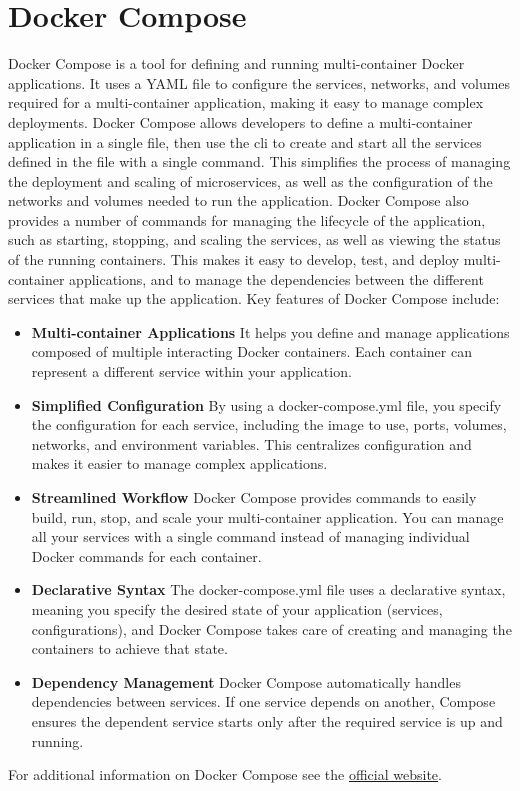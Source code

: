 \section {Docker Compose}
Docker Compose is a tool for defining and running multi-container Docker applications. It uses a YAML file to configure the services, networks, and volumes required for a multi-container application, making it easy to manage complex deployments. Docker Compose allows developers to define a multi-container application in a single file, then use the \gls{cli} to create and start all the services defined in the file with a single command. This simplifies the process of managing the deployment and scaling of microservices, as well as the configuration of the networks and volumes needed to run the application. Docker Compose also provides a number of commands for managing the lifecycle of the application, such as starting, stopping, and scaling the services, as well as viewing the status of the running containers. This makes it easy to develop, test, and deploy multi-container applications, and to manage the dependencies between the different services that make up the application.
Key features of Docker Compose include:
\begin{itemize}
    \item \textbf{Multi-container Applications} It helps you define and manage applications composed of multiple interacting Docker containers. Each container can represent a different service within your application. 
    \item \textbf{Simplified Configuration} By using a docker-compose.yml file, you specify the configuration for each service, including the image to use, ports, volumes, networks, and environment variables. This centralizes configuration and makes it easier to manage complex applications. 
    \item \textbf{Streamlined Workflow} Docker Compose provides commands to easily build, run, stop, and scale your multi-container application. You can manage all your services with a single command instead of managing individual Docker commands for each container. 
    \item \textbf{Declarative Syntax} The docker-compose.yml file uses a declarative syntax, meaning you specify the desired state of your application (services, configurations), and Docker Compose takes care of creating and managing the containers to achieve that state. 
    \item \textbf{Dependency Management} Docker Compose automatically handles dependencies between services. If one service depends on another, Compose ensures the dependent service starts only after the required service is up and running. 
\end{itemize}
    For additional information on Docker Compose see the \href{https://docs.docker.com/compose/}{official website}.

